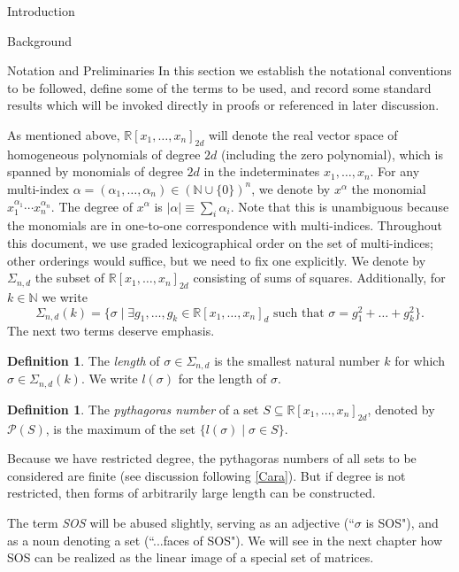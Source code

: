 \documentclass[12pt,oneside,final]{ucthesisucsbmath2010}
\newcommand{\R}{\mathbb{R}}
\newcommand{\N}{\mathbb{N}}
\newcommand{\p}{\mathcal{P}}
\newcommand{\snd}{\Sigma_{n,d}}
\newcommand{\pnd}{\R[x_1,\ldots,x_n]_{2d}}
\newcommand{\pn}{\R[x_1,\ldots,x_n]}
\theoremstyle{definition}
\newtheorem{defn}[thm]{Definition}
\begin{document}
\begin{chapter}{Introduction}
\begin{section}{Background}
\end{section}

\begin{section}{Notation and Preliminaries}
In this section we establish the notational conventions to be followed, define some of the terms to be used, and record some standard results which will be invoked directly in proofs or referenced in later discussion.

As mentioned above, $\pnd$ will denote the real vector space of homogeneous polynomials of degree $2d$ (including the zero polynomial), which is spanned by monomials of degree $2d$ in the indeterminates $x_1,\ldots,x_n$. For any multi-index $\alpha = (\alpha_1,\ldots,\alpha_n) \in (\N \cup \{0\})^n$, we denote by $x^\alpha$ the monomial $x_1^{\alpha_1}\cdots x_n^{\alpha_n}$. The degree of $x^\alpha$ is $|\alpha| \equiv \sum_i \alpha_i$. Note that this is unambiguous because the monomials are in one-to-one correspondence with multi-indices. Throughout this document, we use graded lexicographical order on the set of multi-indices; other orderings would suffice, but we need to fix one explicitly. We denote by $\snd$ the subset of $\pnd$ consisting of sums of squares. Additionally, for $k \in \N$ we write
\[ \snd(k) = \{\sigma \mid \exists g_1,\ldots,g_k \in \pn_{d} \text{ such that } \sigma = g_1^2+\ldots+g_k^2 \}.\]
The next two terms deserve emphasis.

\begin{defn} The \emph{length} of $\sigma \in \snd$ is the smallest natural number $k$ for which $\sigma \in \snd(k)$. We write $l(\sigma)$ for the length of $\sigma$.
\end{defn}

\begin{defn} The \emph{pythagoras number} of a set $S \subseteq \pnd$, denoted by $\p(S)$, is the maximum of the set $\{ l(\sigma) \mid \sigma \in S\}$.
\end{defn}

Because we have restricted degree, the pythagoras numbers of all sets to be considered are finite (see discussion following \ref{Cara}). But if degree is not restricted, then forms of arbitrarily large length can be constructed.

The term \emph{SOS} will be abused slightly, serving as an adjective (``$\sigma$ is SOS"), and as a noun denoting a set (``...faces of SOS"). We will see in the next chapter how SOS can be realized as the linear image of a special set of matrices.


\end{section}
\end{chapter}
\end{document}
